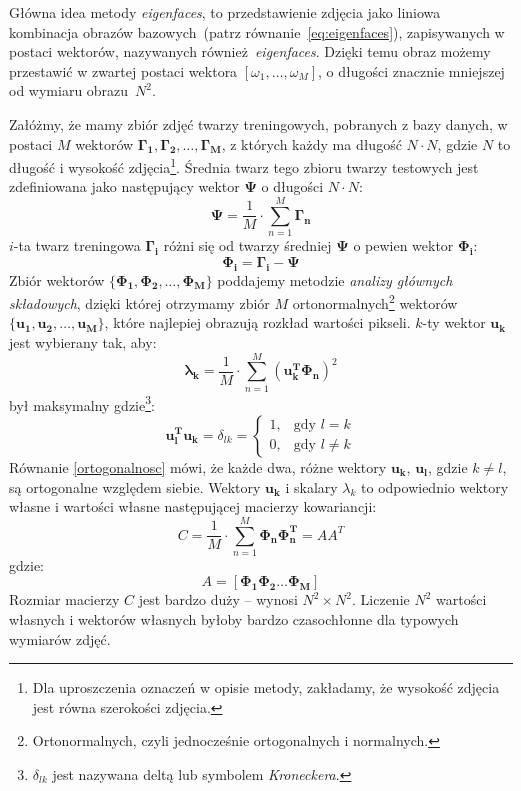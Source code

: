 \documentclass[a4paper,titlepage]{article}
\theoremstyle{break}
\numberwithin{equation}{subsection}
\begin{document}
Główna idea metody \emph{eigenfaces}, to przedstawienie zdjęcia jako liniowa kombinacja obrazów bazowych~(patrz równanie~\ref{eq:eigenfaces}), zapisywanych w postaci wektorów, nazywanych również~\emph{eigenfaces}. Dzięki temu obraz możemy przestawić w zwartej postaci wektora $[\omega_1,\dotsc,\omega_M]$, o długości znacznie mniejszej od wymiaru obrazu~$N^2$.

Załóżmy, że mamy zbiór zdjęć twarzy treningowych, pobranych z bazy danych, w postaci $M$ wektorów $\bm{\Gamma_1},\bm{\Gamma_2},\dotsc,\bm{\Gamma_M}$, z których każdy ma długość $N\cdot N$, gdzie $N$ to długość i wysokość zdjęcia\footnote{Dla uproszczenia oznaczeń w opisie metody, zakładamy, że wysokość zdjęcia jest równa szerokości zdjęcia.}. Średnia twarz tego zbioru twarzy testowych jest zdefiniowana jako następujący wektor $\bm{\Psi}$ o długości $N\cdot N$:
\begin{equation}
	\bm{\Psi}=\frac{1}{M}\cdot\sum\limits_{n=1}^M\bm{\Gamma_n}
\end{equation}
$i$-ta twarz treningowa $\bm{\Gamma_i}$ różni się od twarzy średniej $\bm{\Psi}$ o pewien wektor $\bm{\Phi_i}$:
\begin{equation}
	\bm{\Phi_i}=\bm{\Gamma_i}-\bm{\Psi}
\end{equation}
Zbiór wektorów $\{\bm{\Phi_1},\bm{\Phi_2},\dotsc,\bm{\Phi_M}\}$ poddajemy metodzie \emph{analizy głównych składowych}, dzięki której otrzymamy zbiór $M$ ortonormalnych\footnote{Ortonormalnych, czyli jednocześnie ortogonalnych i normalnych.} wektorów $\{\bm{u_1},\bm{u_2},\dotsc,\bm{u_M}\}$, które najlepiej obrazują rozkład wartości pikseli. $k$-ty wektor $\bm{u_k}$ jest wybierany tak, aby:
\begin{equation}
	\bm{\lambda_k}=\frac{1}{M}\cdot\sum\limits_{n=1}^M(\bm{u_k^T}\bm{\Phi_n})^2
\end{equation}
był maksymalny gdzie\footnote{$\delta_{lk}$ jest nazywana deltą lub symbolem \emph{Kroneckera}.}:
\begin{equation}
\label{ortogonalnosc}
	\bm{u_l^T}\bm{u_k}=\delta_{lk}=
	\begin{cases}
		1,&\text{gdy }l=k\\
		0,&\text{gdy }l\neq k
	\end{cases}
\end{equation}
Równanie \ref{ortogonalnosc} mówi, że każde dwa, różne wektory $\bm{u_k}$, $\bm{u_l}$, gdzie $k\neq l$, są ortogonalne względem siebie. Wektory $\bm{u_k}$ i skalary $\lambda_k$ to odpowiednio wektory własne i wartości własne następującej macierzy kowariancji:
\begin{equation}
	C=\frac{1}{M}\cdot\sum\limits_{n=1}^M\bm{\Phi_n}\bm{\Phi_n^T}=AA^T
\end{equation}
gdzie:
\begin{equation}
	A=[\bm{\Phi_1}\bm{\Phi_2}\dotsc\bm{\Phi_M}]
\end{equation}
Rozmiar macierzy $C$ jest bardzo duży -- wynosi $N^2\times N^2$. Liczenie $N^2$ wartości własnych i wektorów własnych byłoby bardzo czasochłonne dla typowych wymiarów zdjęć.
\end{document}
